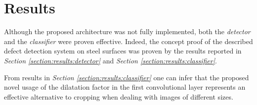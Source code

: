\section{Results}\label{section:results}
\par{
	Although the proposed architecture was not fully implemented, both the \emph{detector} and the \emph{classifier} were proven effective. Indeed, the concept proof of the described defect detection system on steel surfaces was proven by the results reported in \emph{Section \ref{section:results:detector}} and \emph{Section \ref{section:results:classifier}}.
}
\par{
	From results in \emph{Section \ref{section:results:classifier}} one can infer that the proposed novel usage of the dilatation factor in the first convolutional layer represents an effective alternative to cropping when dealing with images of different sizes.
}

